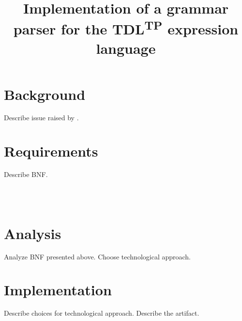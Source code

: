 \documentclass[12pt,oneside,a4paper,draft,notitlepage]{report}
\title{
	Implementation of a grammar parser for the TDL\textsuperscript{TP} expression language
}
\begin{document}
	\maketitle

	\section*{Background}
	\par Describe issue raised by \cite{tdlarticle}.

	\section*{Requirements}
	\par Describe BNF.
	\begin{bnf*}
	{ \bnfor \bnfes}\\
	{ \bnfor {}
		\bnfsp \bnfts{;} \bnfsp {}}\\
	{}
	\end{bnf*}

	\section*{Analysis}
	\par Analyze BNF presented above. Choose technological approach.

	\section*{Implementation}
	\par Describe choices for technological approach. Describe the artifact.

	\printbibliography[
		title=Sources
	]
\end{document}
